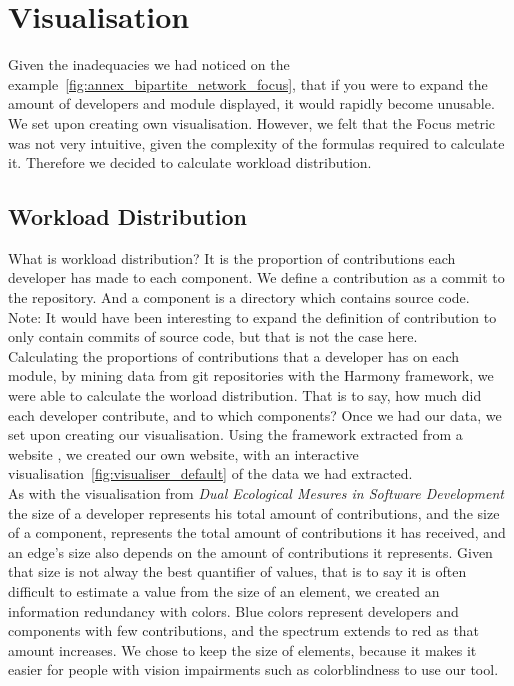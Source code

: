 \section{Visualisation}

Given the inadequacies we had noticed on the example~\ref{fig:annex_bipartite_network_focus}, that if you were to expand the amount of developers and module displayed, it would rapidly become unusable. We set upon creating own visualisation.
However, we felt that the Focus metric was not very intuitive, given the complexity of the formulas required to calculate it. Therefore we decided to calculate workload distribution.

\subsection{Workload Distribution}

What is workload distribution?
It is the proportion of contributions each developer has made to each component.
We define a contribution as a commit to the repository.
And a component is a directory which contains source code.\\
Note: It would have been interesting to expand the definition of contribution to only contain commits of source code, but that is not the case here.\\

Calculating the proportions of contributions that a developer has on each module, by mining data from git repositories with the Harmony\cite{Harmony} framework, we were able to calculate the worload distribution. That is to say, how much did each developer contribute, and to which components?
Once we had our data, we set upon creating our visualisation. Using the framework extracted from a website \cite{peoplemov}, we created our own website, with an interactive visualisation~\ref{fig:visualiser_default} of the data we had extracted.\\[0.3cm]
As with the visualisation from \emph{Dual Ecological Mesures in Software Development}\cite{Posnett} the size of a developer represents his total amount of contributions, and the size of a component, represents the total amount of contributions it has received, and an edge's size also depends on the amount of contributions it represents.
Given that size is not alway the best quantifier of values, that is to say it is often difficult to estimate a value from the size of an element, we created an information redundancy with colors. Blue colors represent developers and components with few contributions, and the spectrum extends to red as that amount increases.
We chose to keep the size of elements, because it makes it easier for people with vision impairments such as colorblindness to use our tool.\\

